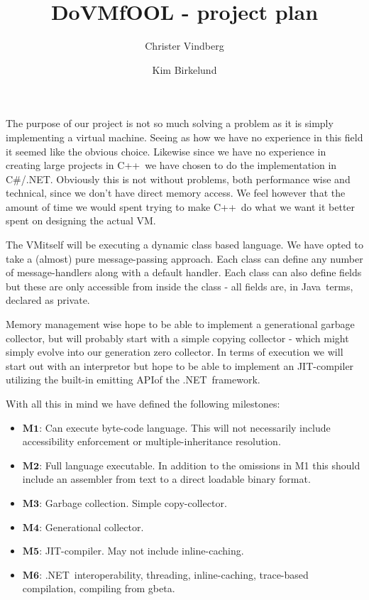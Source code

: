 \documentclass[onside,10pt,left=1cm]{article}
\author{Christer Vindberg \and Kim Birkelund}
\title{DoVMfOOL - project plan}
\newcommand{\csharp}{C\#}
\newcommand{\dotnet}{.NET}
\newcommand{\cpp}{C++}
\newcommand{\java}{Java}
\newcommand{\jit}{JIT}
\newcommand{\gbeta}{gbeta}
\newcommand{\vm}{VM}
\newcommand{\api}{API}
\newcommand{\bold}[1]{$\mathbf{#1}$}
\begin{document}
\maketitle

\setcounter{secnumdepth}{2}

The purpose of our project is not so much solving a problem as it is
simply implementing a virtual machine. Seeing as how we have no
experience in this field it seemed like the obvious choice. Likewise
since we have no experience in creating large projects in \cpp~we have
chosen to do the implementation in \csharp/\dotnet. Obviously this is not
without problems, both performance wise and technical, since we don't
have direct memory access. We feel however that the amount of time
we would spent trying to make \cpp~do what we want it better spent on
designing the actual \vm.

The \vm itself will be executing a dynamic class based language. We
have opted to take a (almost) pure message-passing approach. Each
class can define any number of message-handlers along with a default
handler. Each class can also define fields but these are only
accessible from inside the class - all fields are, in \java~terms,
declared as private. 

Memory management wise hope to be able to implement a generational
garbage collector, but will probably start with a simple copying
collector - which might simply evolve into our generation zero
collector. In terms of execution we will start out with an interpretor
but hope to be able to implement an \jit-compiler utilizing the built-in
emitting \api of the \dotnet~framework.

With all this in mind we have defined the following milestones:

\begin{itemize}

\item \bold{M1}: Can execute byte-code language. This will not
  necessarily include accessibility enforcement or
  multiple-inheritance resolution.

\item \bold{M2}: Full language executable. In addition to the
  omissions in M1 this should include an assembler from text to a
  direct loadable binary format.

\item \bold{M3}: Garbage collection. Simple copy-collector.

\item \bold{M4}: Generational collector.

\item \bold{M5}: \jit-compiler. May not include inline-caching.

\item \bold{M6}: \dotnet~interoperability, threading,
  inline-caching, trace-based compilation, compiling from \gbeta.

\end{itemize}
\end{document}
